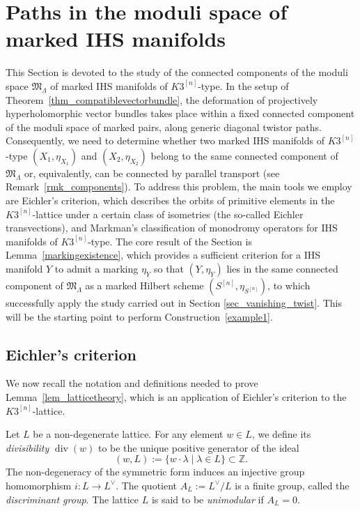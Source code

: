 \documentclass[12pt,a4paper]{amsart}
\theoremstyle{plain}
\theoremstyle{definition}
\theoremstyle{remark}
\newcommand{\ZZ}{\mathbb{Z}}
\newcommand{\Lambdan}{{\Lambda}}
\begin{document}
\section{Paths in the moduli space of marked IHS manifolds}\label{sec_admissible}
This Section is devoted to the study of  the connected components of the moduli space $\mathfrak{M}_\Lambdan$ of marked IHS manifolds of $K3^{[n]}$-type. In the setup of Theorem~\ref{thm_compatiblevectorbundle}, the deformation of projectively hyperholomorphic vector bundles takes place within a fixed connected component of the moduli space of marked pairs, along generic diagonal twistor paths. Consequently, we need to determine whether two marked IHS manifolds of $K3^{[n]}$-type $(X_1,\eta_{X_1})$ and $(X_2,\eta_{X_2})$ belong to the same connected component of $\mathfrak{M}_{\Lambdan}$ or, equivalently, can be connected by parallel transport (see Remark~\ref{rmk_components}). To address this problem, the main tools we employ are Eichler's criterion, which describes the orbits of primitive elements in the $K3^{[n]}$-lattice under a certain class of isometries (the so-called Eichler transvections), and Markman's classification of monodromy operators for IHS manifolds of $K3^{[n]}$-type. The core result of the Section is Lemma~\ref{markingexistence}, which provides a sufficient criterion for a IHS manifold $Y$ to admit a marking $\eta_Y$ so that $(Y,\eta_Y)$ lies in the same connected component of $\mathfrak{M}_\Lambdan$ as a marked Hilbert scheme $(S^{[n]},\eta_{S^{[n]}})$, to which successfully apply the study carried out in Section \ref{sec_vanishing_twist}. This will be the starting point to perform Construction~\ref{example1}.

\subsection{Eichler's criterion} We now recall the notation and definitions needed to prove Lemma~\ref{lem_latticetheory}, which is an application of Eichler's criterion to the $K3^{[n]}$-lattice.

Let $L$ be a non-degenerate lattice. For any element $w\in L$, we define its \textit{divisibility} $\operatorname{div}(w)$ to be the unique positive generator of the ideal
\[
(w,L) := \{w\cdot \lambda \mid \lambda \in L\} \subset \ZZ.
\]
The non-degeneracy of the symmetric form induces an injective group homomorphism $ i \colon L \to L^\vee$. The quotient $A_L := L^\vee / L$ is a finite group, called the \textit{discriminant group}. The lattice $L$ is said to be \textit{unimodular} if $A_L=0$.
\end{document}

